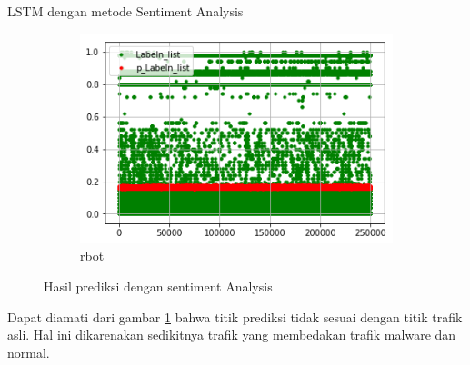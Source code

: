 \documentclass[t]{beamer}
\begin{document}
\begin{frame}{LSTM dengan metode Sentiment Analysis}
\begin{figure}[H]
\begin{subfigure}[b]{.25\linewidth}
        \includegraphics[width=\textwidth]{public/assets/img/lstms_rbot_pred.png}
        \caption{rbot}
        \end{subfigure}
        \caption{Hasil prediksi dengan sentiment Analysis}
        \label{fig:lstmss_pred}
    \end{figure}
    \par Dapat diamati dari gambar \ref{fig:lstmss_pred} bahwa titik prediksi tidak sesuai dengan titik trafik asli. Hal ini dikarenakan sedikitnya trafik yang membedakan trafik malware dan normal.
\end{frame}
\end{document}
